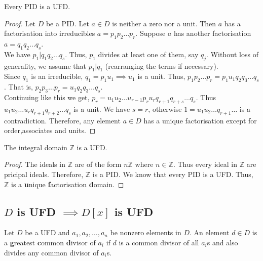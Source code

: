 \begin{theorem}
	Every PID is a UFD.
\end{theorem}
\begin{proof}
	Let $D$ be a PID.
	Let $a \in D$ is neither a zero nor a unit.
	Then $a$ has a factorisation into irreducibles $a= p_1p_2\dots p_r$. 
	Suppose $a$ has another factorisation $a = q_1q_2\dots q_s$.\\

	We have $p_1 | q_1q_2\dots q_s$.
	Thus, $p_1$ divides at least one of them, say $q_j$.
	Without loss of generality, we assume that $p_1 | q_1$ (rearranging the terms if necessary).\\

	Since $q_1$ is an irreducible, $q_1 = p_1u_1 \implies u_1$ is a unit.
	Thus, $p_1p_2 \dots p_r = p_1u_1q_2q_3\dots q_s$.
	That is, $p_2p_3 \dots p_r = u_1 q_2q_3\dots q_s$.\\

	Continuing like this we get, $p_r = u_1u_2\dots u_{r-1} p_ru_rq_{r+1}q_{r+s}\dots q_s$.
	Thus $u_1u_2\dots u_rq_{r+1}q_{r+2}\dots q_s$ is a unit.
	We have $s = r$, otherwise $1 = u_1u_2\dots q_{r+1}\dots$ is a contradiction.
	Therefore, any element $a \in D$ has a unique factorisation except for order,associates and units.
\end{proof}

\begin{corollary}
	The integral domain $\mathbb{Z}$ is a UFD.
\end{corollary}
\begin{proof}
	The ideals in $\mathbb{Z}$ are of the form $n\mathbb{Z}$ where $n \in \mathbb{Z}$.
	Thus every ideal in $\mathbb{Z}$ are pricipal ideals.
	Therefore, $\mathbb{Z}$ is a PID.
	We know that every PID is a UFD.
	Thus, $\mathbb{Z}$ is a \textbf{u}nique \textbf{f}actorisation \textbf{d}omain.
\end{proof}

\subsection{$D$ is UFD $\implies D[x]$ is UFD}
\begin{definition}[gcd]
	Let $D$ be a UFD and $a_1,a_2,\dots,a_n$ be nonzero elements in $D$.
	An element $d \in D$ is a \textbf{g}reatest \textbf{c}ommon \textbf{d}ivisor of $a_i$ if $d$ is a common divisor of all $a_i$s and also divides any common divisor of $a_i$s.
\end{definition}

